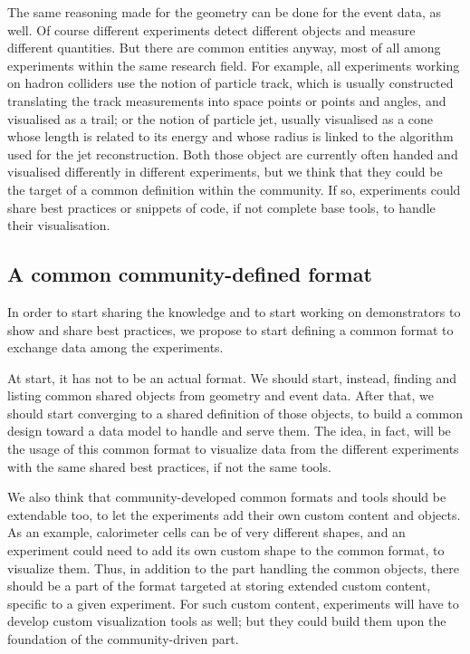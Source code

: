 \documentclass[12pt,a4paper]{article}
\begin{document}
The same reasoning made for the geometry can be done for the event data, as well. Of course different experiments detect
different objects and measure different quantities. But there are common entities anyway, most of all among experiments
within the same research field. For example, all experiments working on hadron colliders use the notion of particle track,
which is usually constructed translating the track measurements into space points or points and angles, and visualised as
a trail; or the notion of particle jet, usually visualised as a cone whose length is related to its energy and whose radius
is linked to the algorithm used for the jet reconstruction. Both those object are currently often handed and visualised
differently in different experiments, but we think that they could be the target of a common definition within the community.
If so, experiments could share best practices or snippets of code, if not complete base tools, to handle their visualisation.

\hypertarget{common-format}{%
\subsection{A common community-defined format}\label{common-format}}

In order to start sharing the knowledge and to start working on demonstrators to show and share best practices, we propose to
start defining a common format to exchange data among the experiments.

At start, it has not to be an actual format. We should start, instead, finding and listing common shared objects from geometry
and event data. After that, we should start converging to a shared definition of those objects, to build a common design toward
a data model to handle and serve them. The idea, in fact, will be the usage of this common format to visualize data from the
different experiments with the same shared best practices, if not the same tools.

We also think that community-developed common formats and tools should be extendable too, to let the experiments add their own
custom content and objects. As an example, calorimeter cells can be of very different shapes, and an experiment could need to
add its own custom shape to the common format, to visualize them. Thus, in addition to the part handling the common objects,
there should be a part of the format targeted at storing extended custom content, specific to a given experiment. For such
custom content, experiments will have to develop custom visualization tools as well; but they could build them upon the foundation
of the community-driven part.
\end{document}
